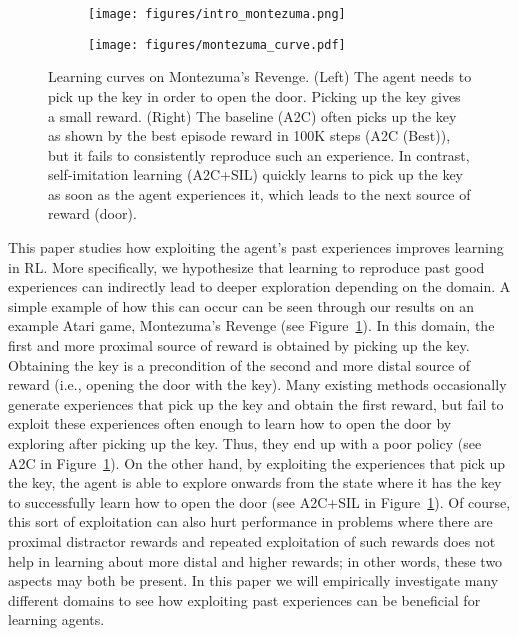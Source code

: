 \documentclass{article}
\begin{document}
\begin{figure}
    \centering
    \begin{subfigure}{0.38\linewidth}
    	\centering
	    \texttt{[image: figures/intro\_montezuma.png]} 
   	\end{subfigure}
   	\hspace{-7pt}
    \begin{subfigure}{0.6\linewidth}
    	\centering
	    \texttt{[image: figures/montezuma\_curve.pdf]} 
   	\end{subfigure}
   	\vskip -0.07in
	\caption{Learning curves on Montezuma's Revenge. (Left) The agent needs to pick up the key in order to open the door. Picking up the key gives a small reward. (Right) The baseline (A2C) often picks up the key as shown by the best episode reward in 100K steps (A2C (Best)), but it fails to consistently reproduce such an experience. In contrast, self-imitation learning (A2C+SIL) quickly learns to pick up the key as soon as the agent experiences it, which leads to the next source of reward (door).} 
	\vskip -0.15in
	\label{fig:intro}
\end{figure}

This paper studies how exploiting the agent's past experiences improves learning in RL. More specifically, we hypothesize that learning to reproduce past good experiences can indirectly lead to deeper exploration depending on the domain. 
A simple example of how this can occur can be seen 
through our results on an example Atari game, Montezuma's Revenge (see Figure~\ref{fig:intro}). In this domain, the first and more proximal source of reward is obtained by picking up the key. Obtaining the key is a precondition of the second and more distal source of reward (i.e., opening the door with the key). Many existing methods occasionally generate experiences that pick up the key and obtain the first reward, but fail to exploit these experiences often enough to learn how to open the door by exploring after picking up the key. Thus, they end up with a poor policy (see A2C in Figure~\ref{fig:intro}).
On the other hand, by exploiting the experiences that pick up the key, the agent is able to explore onwards from the state where it has the key to successfully learn how to open the door (see A2C+SIL in Figure~\ref{fig:intro}). 
Of course, this sort of exploitation can also hurt performance in problems where there are proximal distractor rewards and repeated exploitation of such rewards does not help in learning about more distal and higher rewards; in other words, these two aspects may both be present. 
In this paper we will empirically investigate many different domains to see how exploiting past experiences can be beneficial for learning agents. 
\end{document}
